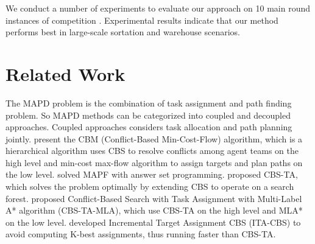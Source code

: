 \documentclass[letterpaper]{article} %
\begin{document}

We conduct a number of experiments to evaluate our approach on 10 main round instances of competition \cite{benchmark2024lorr}. 
Experimental results indicate that our method performs best in large-scale sortation and warehouse scenarios. 



\section{Related Work}
The MAPD problem is the combination of task assignment and path finding problem. 
So MAPD methods can be categorized into coupled and decoupled approaches.
Coupled approaches considers task allocation and path planning jointly. 
\citet{ma2016optimal} present the CBM (Conflict-Based Min-Cost-Flow) algorithm, 
which is a hierarchical algorithm uses CBS to resolve conflicts among agent teams on the high level and min-cost max-flow algorithm to assign targets and plan paths on the low level. 
\citet{nguyen2019generalized} solved MAPF with answer set programming. 
\citet{honig2018conflict} proposed CBS-TA, which solves the problem optimally by extending CBS to operate on a search forest. 
\citet{zhong2022optimal} proposed Conflict-Based Search with Task Assignment with Multi-Label A* algorithm (CBS-TA-MLA), which use CBS-TA \cite{honig2018conflict} on the high level and MLA* \cite{grenouilleau2019multi} on the low level. 
\citet{tang2023solving} developed Incremental Target Assignment CBS (ITA-CBS) to avoid computing K-best assignments, 
thus running faster than CBS-TA. 
\end{document}
